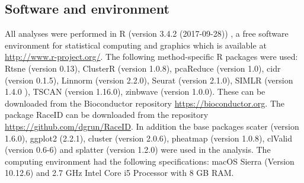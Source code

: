\documentclass[12pt, a4paper]{article}\usepackage[]{graphicx}\usepackage[]{color}
\begin{document}
\subsection{Software and environment}
All analyses were performed in R (version 3.4.2 (2017-09-28)) \citep{R}, a free software environment for statistical computing and graphics which is available at \url{http://www.r-project.org/}. The following method-specific R packages were used: Rtsne (version 0.13), ClusterR (version 1.0.8), pcaReduce (version 1.0), cidr (version 0.1.5), Linnorm (version 2.2.0), Seurat (version 2.1.0), SIMLR (version 1.4.0 ), TSCAN (version 1.16.0), zinbwave (version 1.0.0). These can be downloaded from the Bioconductor repository \url{https://bioconductor.org}. The package RaceID can be downloaded from the repository \url{https://github.com/dgrun/RaceID}. In addition the base packages scater (version 1.6.0), ggplot2 (2.2.1), cluster (version 2.0.6), pheatmap (version 1.0.8), clValid (version 0.6-6) and splatter (version 1.2.0) were used in the analysis. The computing environment had the following specifications: macOS Sierra (Version 10.12.6) and 2.7 GHz Intel Core i5 Processor with 8 GB RAM.


\begin{table}[htbp]
  \centering
  \caption{Overview of filtering and normalisation steps by method.}
  \label{tblone}%
\end{table}%
\end{document}
